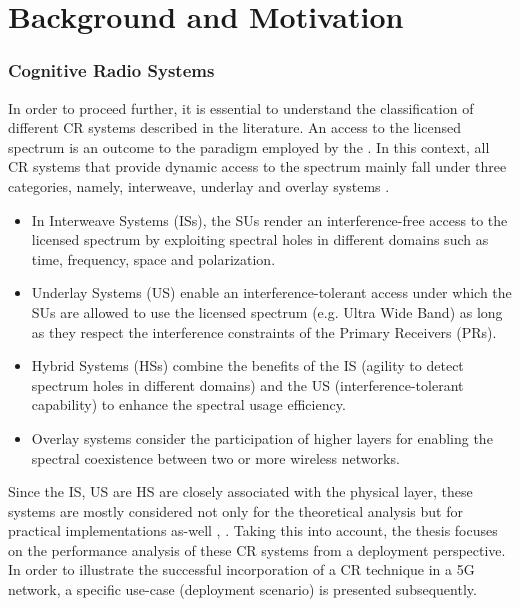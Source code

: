 \section{Background and Motivation}
\label{sec:mot}

\subsubsection*{Cognitive Radio Systems}
In order to proceed further, it is essential to understand the classification of different CR systems described in the literature. An access to the licensed spectrum is an outcome to the paradigm employed by the . In this context, all CR systems that provide dynamic access to the spectrum mainly fall under three categories, namely, interweave, underlay and overlay systems \cite{Goldsmith09}. 
\begin{itemize}
\item In Interweave Systems (ISs), the SUs render an interference-free access to the licensed spectrum by exploiting spectral holes in different domains such as time, frequency, space and polarization. 
\item Underlay Systems (US) enable an interference-tolerant access under which the SUs are allowed to use the licensed spectrum (e.g. Ultra Wide Band) as long as they respect the interference constraints of the Primary Receivers (PRs). 
\item Hybrid Systems (HSs) combine the benefits of the IS (agility to detect spectrum holes in different domains) and the US (interference-tolerant capability) to enhance the spectral usage efficiency.  
\item Overlay systems consider the participation of higher layers for enabling the spectral coexistence between two or more wireless networks. 
\end{itemize}
Since the IS, US are HS are closely associated with the physical layer, these systems are mostly considered not only for the theoretical analysis but for practical implementations as-well , \cite{Cabric06, Kim10}. Taking this into account, the thesis focuses on the performance analysis of these CR systems from a deployment perspective. In order to illustrate the successful incorporation of a CR technique in a 5G network, a specific use-case (deployment scenario) is presented subsequently. 




